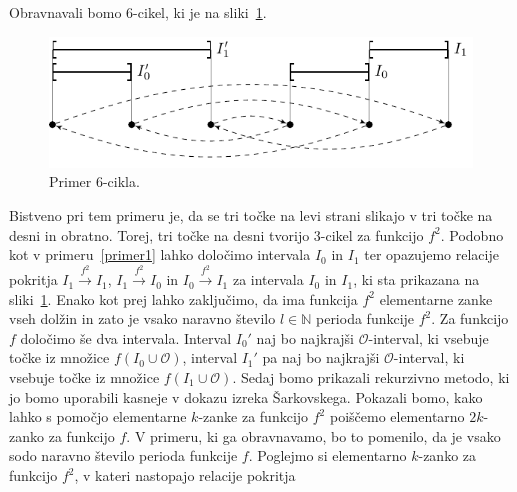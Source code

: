 \documentclass[mat2]{fmfdelo}
\newcommand{\N}{\mathbb N}
\begin{document}
\begin{primer}[6-cikel] \label{primer4}
Obravnavali bomo 6-cikel, ki je na sliki~\ref{fig:6cikel}. 
 \begin{figure}[h]
  \centering
  \includegraphics{images/sestcikel.pdf}
  \caption[Primer vektorske slike.]{Primer 6-cikla.}
  \label{fig:6cikel}
\end{figure}
Bistveno pri tem primeru je, da se tri točke na levi strani slikajo v tri točke na desni in obratno. Torej, tri točke na desni tvorijo 3-cikel
 za funkcijo $f^2$. Podobno kot v primeru~\ref{primer1} lahko določimo intervala $I_0$ in $I_1$ ter opazujemo relacije pokritja $I_1 \xrightarrow{f^2} I_1$, $I_1 \xrightarrow{f^2} I_0$ in $I_0 \xrightarrow{f^2} I_1$ za intervala $I_0$ in $I_1$, ki sta prikazana na sliki~\ref{fig:6cikel}. Enako kot prej lahko zaključimo, da ima funkcija $f^2$ elementarne zanke vseh dolžin in zato je vsako naravno število $l \in \N$ perioda funkcije $f^2$. Za funkcijo $f$ določimo še dva intervala. Interval $I_0'$ naj bo najkrajši $\mathcal{O}$-interval, ki vsebuje točke iz množice $f(I_0 \cup \mathcal{O})$, interval $I_1'$ pa naj bo najkrajši $\mathcal{O}$-interval, ki vsebuje točke iz množice $f(I_1 \cup \mathcal{O})$. Sedaj bomo prikazali rekurzivno metodo, ki jo bomo uporabili kasneje v dokazu izreka Šarkovskega. Pokazali bomo, kako lahko s pomočjo elementarne $k$-zanke za funkcijo $f^2$ poiščemo elementarno $2k$-zanko za funkcijo $f$. V primeru, ki ga obravnavamo, bo to pomenilo, da je vsako sodo naravno število perioda funkcije $f$.
Poglejmo si elementarno $k$-zanko za funkcijo $f^2$, v kateri nastopajo relacije pokritja 

\end{primer}
\end{document}
